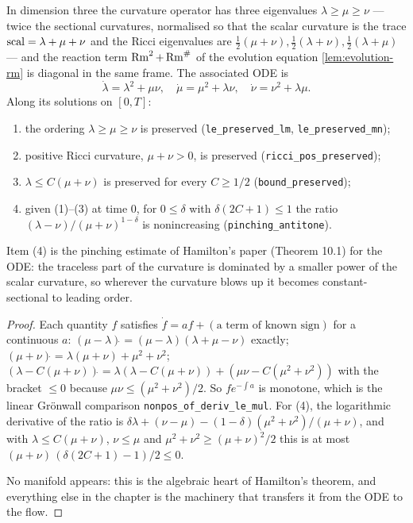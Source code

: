 \begin{lemma}
  \label{lem:pinching-ode}
  \leanok
  In dimension three the curvature operator has three eigenvalues
  $\lambda \ge \mu \ge \nu$ --- twice the sectional curvatures, normalised so
  that the scalar curvature is the trace $\operatorname{scal} = \lambda+\mu+\nu$ and the
  Ricci eigenvalues are
  $\tfrac12(\mu+\nu), \tfrac12(\lambda+\nu), \tfrac12(\lambda+\mu)$ --- and the reaction term
  $\operatorname{Rm}^2 + \operatorname{Rm}^\#$ of the evolution equation \ref{lem:evolution-rm} is
  diagonal in the same frame. The associated ODE is
  \[
    \dot\lambda = \lambda^2 + \mu\nu,\quad
    \dot\mu = \mu^2 + \lambda\nu,\quad
    \dot\nu = \nu^2 + \lambda\mu .
  \]
  Along its solutions on $[0,T]$:
  \begin{enumerate}
  \item the ordering $\lambda \ge \mu \ge \nu$ is preserved
    (\texttt{le\_preserved\_lm}, \texttt{le\_preserved\_mn});
  \item positive Ricci curvature, $\mu + \nu > 0$, is preserved
    (\texttt{ricci\_pos\_preserved});
  \item $\lambda \le C(\mu+\nu)$ is preserved for every $C \ge 1/2$
    (\texttt{bound\_preserved});
  \item given (1)--(3) at time $0$, for $0 \le \delta$ with
    $\delta(2C+1) \le 1$ the ratio $(\lambda-\nu)/(\mu+\nu)^{1-\delta}$ is
    nonincreasing (\texttt{pinching\_antitone}).
  \end{enumerate}
  Item (4) is the pinching estimate of Hamilton's paper (Theorem 10.1) for the
  ODE: the traceless part of the curvature is dominated by a smaller power of
  the scalar curvature, so wherever the curvature blows up it becomes
  constant-sectional to leading order.
\end{lemma}

\begin{proof}
  \leanok
  Each quantity $f$ satisfies $\dot f = a f + (\text{a term of known sign})$
  for a continuous $a$: $(\mu-\lambda)\dot{} = (\mu-\lambda)(\lambda+\mu-\nu)$
  exactly; $(\mu+\nu)\dot{} = \lambda(\mu+\nu) + \mu^2+\nu^2$;
  $(\lambda - C(\mu+\nu))\dot{} = \lambda(\lambda - C(\mu+\nu)) +
  (\mu\nu - C(\mu^2+\nu^2))$ with the bracket $\le 0$ because
  $\mu\nu \le (\mu^2+\nu^2)/2$. So $f e^{-\int a}$ is monotone, which is the
  linear Grönwall comparison \texttt{nonpos\_of\_deriv\_le\_mul}. For (4),
  the logarithmic derivative of the ratio is
  $\delta\lambda + (\nu-\mu) - (1-\delta)(\mu^2+\nu^2)/(\mu+\nu)$, and with
  $\lambda \le C(\mu+\nu)$, $\nu \le \mu$ and $\mu^2+\nu^2 \ge (\mu+\nu)^2/2$
  this is at most $(\mu+\nu)\,(\delta(2C+1)-1)/2 \le 0$.

  No manifold appears: this is the algebraic heart of Hamilton's theorem,
  and everything else in the chapter is the machinery that transfers it from
  the ODE to the flow.
\end{proof}

